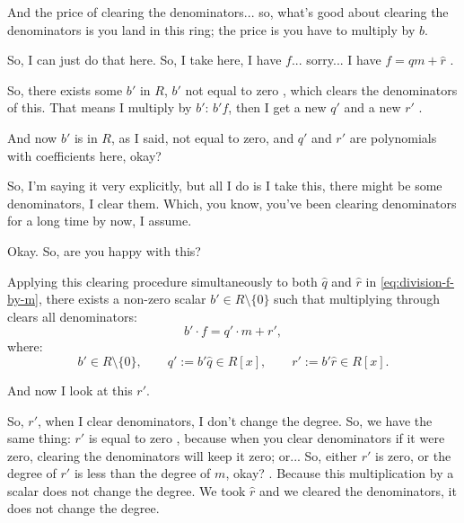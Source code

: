 \begin{proofWrapper}
\begin{speech}[00:24:54 - 00:25:59]
And the price of clearing the denominators... so, what's good about clearing the denominators is you land in this ring; the price is you have to multiply by $b$.

So, I can just do that here. So, I take here, I have $f$... sorry...  I have $f = \hat{q} m + \hat{r}$ .

So, there exists some $b'$ in $R$, $b'$ not equal to zero , which clears the denominators of this. That means I multiply by $b'$: $b' f$, then I get a new $q'$ and a new $r'$ .

And now $b'$ is in $R$, as I said, not equal to zero, and $q'$ and $r'$ are polynomials with coefficients here, okay? 

So, I'm saying it very explicitly, but all I do is I take this, there might be some denominators, I clear them. Which, you know, you've been clearing denominators for a long time by now, I assume.

Okay. So, are you happy with this?
\end{speech}

\begin{content}
Applying this clearing procedure simultaneously to both $\hat{q}$ and $\hat{r}$ in \eqref{eq:division-f-by-m}, there exists a non-zero scalar $b' \in R \setminus \{0\}$ such that multiplying through clears all denominators:
\begin{equation}\label{eq:cleared-div-f}
b' \cdot f = q' \cdot m + r',
\end{equation}
where:
\begin{equation}\label{eq:cleared-coeffs-f}
b' \in R \setminus \{0\}, \qquad q' := b' \hat{q} \in R[x], \qquad r' := b' \hat{r} \in R[x].
\end{equation}
\end{content}

\begin{speech}[00:25:59 - 00:28:09]
And now I look at this $r'$.

So, $r'$, when I clear denominators, I don't change the degree. So, we have the same thing: $r'$ is equal to zero , because when you clear denominators if it were zero, clearing the denominators will keep it zero; or... So, either $r'$ is zero, or the degree of $r'$ is less than the degree of $m$, okay? . Because this multiplication by a scalar does not change the degree. We took $\hat{r}$ and we cleared the denominators, it does not change the degree.


\end{speech}
\end{proofWrapper}
